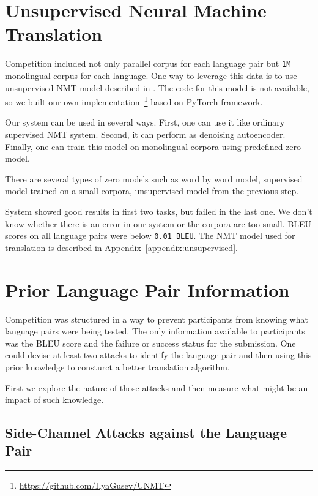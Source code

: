 \documentclass[]{article}
\begin{document}
\section{Unsupervised Neural Machine Translation}
\label{sect:unmt}

Competition included not only parallel corpus for each language pair but  {\tt 1M} monolingual corpus for each language.
One way to leverage this data is to use unsupervised NMT model described in \cite{DBLP:journals/corr/abs-1711-00043}.
The code for this model is not available, so we built our own implementation~\footnote{\url{https://github.com/IlyaGusev/UNMT}} based on PyTorch framework. 

Our system can be used in several ways. First, one can use it like ordinary supervised NMT system. Second, it can perform as denoising autoencoder. Finally, one can train this model on monolingual corpora using predefined zero model.

There are several types of zero models such as word by word model, supervised model trained on a small corpora, unsupervised model from the previous step.

System showed good results in first two tasks, but failed in the last one. We don't know whether there is an error in our system or the corpora are too small. BLEU scores on all language pairs were below {\tt 0.01 BLEU}.
The NMT model used for translation is described in Appendix~\ref{appendix:unsupervised}.

\section{Prior Language Pair Information}
\label{sect:nonoblivious}

Competition was structured in a way to prevent participants from knowing what language pairs were being tested.
The only information available to participants was the BLEU score and the failure or success status for the submission.
One could devise at least two attacks to identify the language pair and then using this prior knowledge to consturct a better translation algorithm.

First we explore the nature of those attacks and then measure what might be an impact of such knowledge.

\subsection{Side-Channel Attacks against the Language Pair}
\label{sect:attack}
\end{document}
